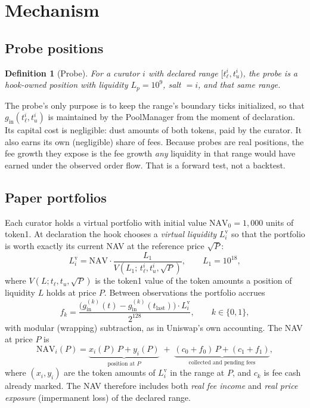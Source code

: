 \documentclass[11pt,a4paper]{article}
\newtheorem{definition}{Definition}
\newcommand{\Lv}{L^{\mathrm{v}}}
\newcommand{\NAV}{\mathrm{NAV}}
\newcommand{\Q}{2^{128}}
\begin{document}
\section{Mechanism}

\subsection{Probe positions}
\begin{definition}[Probe]
For a curator $i$ with declared range $[t_\ell^i, t_u^i)$, the probe is a hook-owned position with liquidity $L_p = 10^9$, salt $= i$, and that same range.
\end{definition}

The probe's only purpose is to keep the range's boundary ticks initialized, so that $g_{\text{in}}(t_\ell^i,t_u^i)$ is maintained by the PoolManager from the moment of declaration. Its capital cost is negligible: dust amounts of both tokens, paid by the curator. It also earns its own (negligible) share of fees. Because probes are real positions, the fee growth they expose is the fee growth \emph{any} liquidity in that range would have earned under the observed order flow. That is a forward test, not a backtest.

\subsection{Paper portfolios}
Each curator holds a virtual portfolio with initial value $\NAV_0 = 1{,}000$ units of token1. At declaration the hook chooses a \emph{virtual liquidity} $\Lv_i$ so that the portfolio is worth exactly its current NAV at the reference price $\sqrt{P}$:
\begin{equation}
  \Lv_i = \NAV \cdot \frac{L_1}{V(L_1;\, t_\ell^i, t_u^i, \sqrt{P})}, \qquad L_1 = 10^{18},
\end{equation}
where $V(L; t_\ell, t_u, \sqrt P)$ is the token1 value of the token amounts a position of liquidity $L$ holds at price $P$. Between observations the portfolio accrues
\begin{equation}
  f_k = \frac{\big(g^{(k)}_{\text{in}}(t) - g^{(k)}_{\text{in}}(t_{\text{last}})\big)\cdot \Lv_i}{\Q}, \qquad k\in\{0,1\},
\end{equation}
with modular (wrapping) subtraction, as in Uniswap's own accounting. The NAV at price $P$ is
\begin{equation}
  \NAV_i(P) = \underbrace{x_i(P)\,P + y_i(P)}_{\text{position at }P} \;+\; \underbrace{(c_0 + f_0)\,P + (c_1 + f_1)}_{\text{collected and pending fees}},
\end{equation}
where $(x_i, y_i)$ are the token amounts of $\Lv_i$ in the range at $P$, and $c_k$ is fee cash already marked. The NAV therefore includes both \emph{real fee income} and \emph{real price exposure} (impermanent loss) of the declared range.
\end{document}
